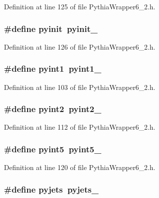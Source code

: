 Definition at line 125 of file Pythia\-Wrapper6\_\-2.h.
\subsubsection{\setlength{\rightskip}{0pt plus 5cm}\#define pyinit~pyinit\_\-}\label{PythiaWrapper6__2_8h_c0ceff918a25129e71d14e6bdcc15f83}




Definition at line 126 of file Pythia\-Wrapper6\_\-2.h.
\subsubsection{\setlength{\rightskip}{0pt plus 5cm}\#define pyint1~{\bf pyint1\_\-}}\label{PythiaWrapper6__2_8h_d83b4003fc0564d8224db1fc12a71a8d}




Definition at line 103 of file Pythia\-Wrapper6\_\-2.h.
\subsubsection{\setlength{\rightskip}{0pt plus 5cm}\#define pyint2~{\bf pyint2\_\-}}\label{PythiaWrapper6__2_8h_02425c70e715c36246b83643ea25d4c4}




Definition at line 112 of file Pythia\-Wrapper6\_\-2.h.
\subsubsection{\setlength{\rightskip}{0pt plus 5cm}\#define pyint5~{\bf pyint5\_\-}}\label{PythiaWrapper6__2_8h_eaf2a9dbc5f0cc71eb806a0901b4dc90}




Definition at line 120 of file Pythia\-Wrapper6\_\-2.h.
\subsubsection{\setlength{\rightskip}{0pt plus 5cm}\#define pyjets~{\bf pyjets\_\-}}\label{PythiaWrapper6__2_8h_42bad680548e15c3c12a4874fa4d1ccc}




